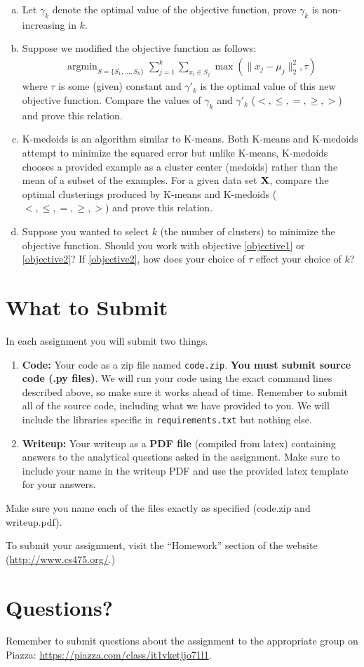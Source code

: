 \documentclass[11pt]{article}
\newcommand{\X}{{\bf X}}
\begin{document}
	\begin{enumerate}[(a)]
		\item Let $\gamma_k$ denote the optimal value of the objective function, prove $\gamma_k$ is non-increasing in $k$.
		\item Suppose we modified the objective function as follows:
		\begin{eqnarray}
		\mathop{\textrm{argmin}}_{S=\{S_1,...,S_k\}}\sum_{j=1}^k\sum_{x_i\in S_j}\max(\|x_j-\mu_j\|_2^2, \tau)
		\label{objective2}
		\end{eqnarray}
		where $\tau$ is some (given) constant and $\gamma'_k$ is the optimal value of this new objective function. Compare the values of 
		$\gamma_k$ and $\gamma'_k$ ($<, \le, =, \ge, >$) and prove this relation.
		\item K-medoids is an algorithm similar to K-means. Both K-means and K-medoids attempt to minimize the squared error but unlike K-means, K-medoids chooses a provided example as a cluster center (medoids) rather than the mean of a subset of the examples. For a given data set $\X$, compare the optimal clusterings produced by K-means and K-medoids ($<, \le, =, \ge, >$) and prove this relation.
		\item Suppose you wanted to select $k$ (the number of clusters) to minimize the objective function. Should you work with objective \ref{objective1} or \ref{objective2}? If \ref{objective2}, how does your choice of $\tau$ effect your choice of $k$?
	\end{enumerate}
	
	\section{What to Submit}
	In each assignment you will submit two things.
	\begin{enumerate}
		\item {\bf Code:} Your code as a zip file named {\tt code.zip}. {\bf You must submit source code (.py files)}. We will run your code using the exact command lines described above, so make sure it works ahead of time. Remember to submit all of the source code, including what we have provided to you. We will include the libraries specific in {\tt requirements.txt} but nothing else.
		\item {\bf Writeup:} Your writeup as a {\bf PDF file} (compiled from latex) containing answers to the analytical questions asked in the assignment. Make sure to include your name in the writeup PDF and use the provided latex template for your answers.
	\end{enumerate}
	Make sure you name each of the files exactly as specified (code.zip and writeup.pdf).
	
	To submit your assignment, visit the ``Homework'' section of the website (\href{http://www.cs475.org/}{http://www.cs475.org/}.)
	
	
	
	\section{Questions?}
	Remember to submit questions about the assignment to the appropriate group on Piazza: \href{https://piazza.com/class/it1vketjjo71l1}{https://piazza.com/class/it1vketjjo71l1}.
	
\end{document}
